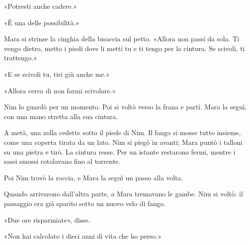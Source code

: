 \documentclass[10pt,a4paper]{article}
\begin{document}
«Potresti anche cadere.»

«È una delle possibilità.»

Mara si strinse la cinghia della bisaccia sul petto. «Allora non passi da sola. Ti vengo dietro, metto i piedi dove li metti tu e ti tengo per la cintura. Se scivoli, ti trattengo.»

«E se scivoli tu, tiri giù anche me.»

«Allora cerca di non farmi scivolare.»

Nim lo guardò per un momento. Poi si voltò verso la frana e partì. Mara la seguì, con una mano stretta alla sua cintura.

A metà, una zolla cedette sotto il piede di Nim. Il fango si mosse tutto insieme, come una coperta tirata da un lato. Nim si piegò in avanti; Mara puntò i talloni su una pietra e tirò. La cintura resse. Per un istante restarono fermi, mentre i sassi smossi rotolavano fino al torrente.

Poi Nim trovò la roccia, e Mara la seguì un passo alla volta.

Quando arrivarono dall'altra parte, a Mara tremavano le gambe. Nim si voltò: il passaggio era già sparito sotto un nuovo velo di fango.

«Due ore risparmiate», disse.

«Non hai calcolato i dieci anni di vita che ho perso.»
\end{document}
